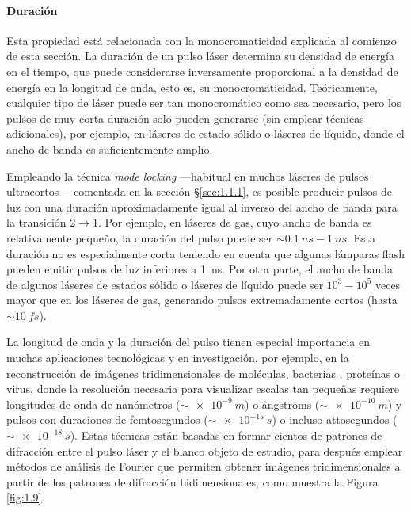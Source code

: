 \paragraph{Duración}
Esta propiedad está relacionada con la monocromaticidad explicada al comienzo de esta sección. La duración de un pulso láser determina su densidad de energía en el tiempo, que puede considerarse inversamente proporcional a la densidad de energía en la longitud de onda, esto es, su monocromaticidad\autocite{Svelto2010}. Teóricamente, cualquier tipo de láser puede ser tan monocromático como sea necesario, pero los pulsos de muy corta duración solo pueden generarse (sin emplear técnicas adicionales), por ejemplo, en láseres de estado sólido o láseres de líquido, donde el ancho de banda es suficientemente amplio.

Empleando la técnica \emph{mode locking} ---habitual en muchos láseres de pulsos ultracortos--- comentada en la sección \S\ref{sec:1.1.1}, es posible producir pulsos de luz con una duración aproximadamente igual al inverso del ancho de banda para la transición $2 \rightarrow 1$. Por ejemplo, en láseres de gas, cuyo ancho de banda es relativamente pequeño, la duración del pulso puede ser $\sim\qty{0,1}{ns}-\qty{1}{ns}$. Esta duración no es especialmente corta teniendo en cuenta que algunas lámparas flash pueden emitir pulsos de luz inferiores a \qty{1}{ns}. Por otra parte, el ancho de banda de algunos láseres de estados sólido o láseres de líquido puede ser $10^3-10^5$ veces mayor que en los láseres de gas, generando pulsos extremadamente cortos (hasta $\sim\qty{10}{fs}$).

La longitud de onda y la duración del pulso tienen especial importancia en muchas aplicaciones tecnológicas y en investigación, por ejemplo, en la reconstrucción de imágenes tridimensionales de moléculas\autocite{vonArdenne2018}, bacterias \autocite{Fan2016}, proteínas \autocite{Neutze2000} o virus\autocite{Ekeberg2015}, donde la resolución necesaria para visualizar escalas tan pequeñas requiere longitudes de onda de nanómetros ($\sim\qty{e-9}{m}$) o ångströms ($\sim\qty{e-10}{m}$) y pulsos con duraciones de femtosegundos ($\sim\qty{e-15}{s}$) o incluso attosegundos ($\sim\qty{e-18}{s}$). Estas técnicas están basadas en formar cientos de patrones de difracción entre el pulso láser y el blanco objeto de estudio, para después emplear métodos de análisis de Fourier que permiten obtener imágenes tridimensionales a partir de los patrones de difracción bidimensionales, como muestra la Figura \ref{fig:1.9}.

